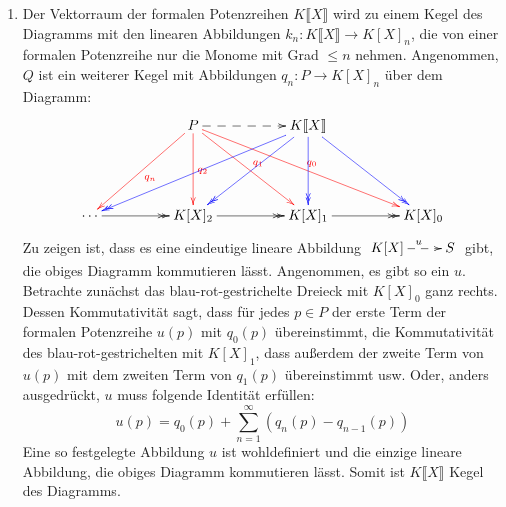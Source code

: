 \documentclass{pizzablatt}
\begin{document}
\begin{aufgabe}{}
\begin{enumerate}
\item Der Vektorraum der formalen Potenzreihen $K\llbracket X \rrbracket$ wird zu einem Kegel des Diagramms mit den linearen Abbildungen $k_n : K\llbracket X \rrbracket \to K[X]_{n}$, die von einer formalen Potenzreihe nur die Monome mit Grad $\leq n$ nehmen. Angenommen, $Q$ ist ein weiterer Kegel mit Abbildungen $q_n:P \to K[X]_{n}$ über dem Diagramm:
\[ \xymatrixcolsep{4pc}\xymatrixrowsep{4pc}\xymatrix {
  & P \ar@[red][ld]^{\textcolor{red}{q_{n}}} \ar@[red][d]^{\textcolor{red}{{q_{2}}}} \ar@[red][dr]^{\textcolor{red}{q_{1}}} \ar@[red][drr]^{\textcolor{red}{q_{0}}} \ar@{-->}[r]
  & K\llbracket X \rrbracket \ar@[blue]@{->>}[dll] \ar@[blue]@{->>}[dl] \ar@[blue]@{->>}[d] \ar@[blue]@{->>}[dr] \\
  \cdots \ar@{->>}[r] & K[X]_{2} \ar@{->>}[r] & K[X]_{1} \ar@{->>}[r] & K[X]_{0}
} \]
Zu zeigen ist, dass es eine eindeutige lineare Abbildung $\xymatrix{K[X] \ar@{-->}[r]^{u} & S}$ gibt, die obiges Diagramm kommutieren lässt. Angenommen, es gibt so ein $u$. Betrachte zunächst das blau-rot-gestrichelte Dreieck mit $K[X]_{0}$ ganz rechts. Dessen Kommutativität sagt, dass für jedes $p \in P$ der erste Term der formalen Potenzreihe $u(p)$ mit $q_{0}(p)$ übereinstimmt, die Kommutativität des blau-rot-gestrichelten mit $K[X]_{1}$, dass außerdem der zweite Term von $u(p)$ mit dem zweiten Term von $q_{1}(p)$ übereinstimmt usw. Oder, anders ausgedrückt, $u$ muss folgende Identität erfüllen:
\[ u(p) = q_{0}(p) + \sum_{n=1}^{\infty} \left(q_{n}(p) - q_{n-1}(p)\right) \]
Eine so festgelegte Abbildung $u$ ist wohldefiniert und die einzige lineare Abbildung, die obiges Diagramm kommutieren lässt. Somit ist $K\llbracket X \rrbracket$ Kegel des Diagramms.
\end{enumerate}
\end{aufgabe}
\end{document}
